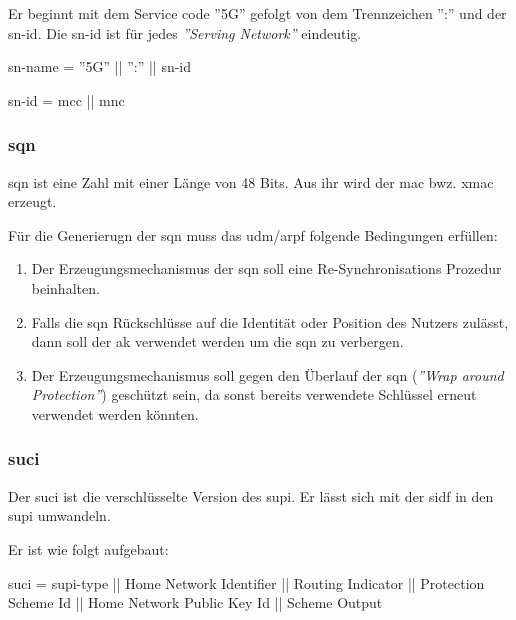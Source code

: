 Er beginnt mit dem Service code ''5G'' gefolgt von dem Trennzeichen '':'' und der \gls{sn-id}.
Die \gls{sn-id} ist f\"ur jedes \textit{''Serving Network''} eindeutig.

\gls{sn-name} = ''5G'' || '':'' || \gls{sn-id}

\gls{sn-id} = \gls{mcc} || \gls{mnc}

\subsubsection{\gls{sqn}}
\gls{sqn} ist eine Zahl mit einer L\"ange von 48 Bits. %
Aus ihr wird der \gls{mac} bwz. \gls{xmac} erzeugt. %

F\"ur die Generierugn der \gls{sqn} muss das \gls{udm}/\gls{arpf} folgende Bedingungen erf\"ullen:\\%
\begin{enumerate}
\item Der Erzeugungsmechanismus der \gls{sqn} soll eine Re-Synchronisations Prozedur beinhalten.\\
\item Falls die \gls{sqn} R\"uckschl\"usse auf die Identit\"at oder Position des Nutzers zul\"asst, dann soll der \gls{ak} verwendet werden um die \gls{sqn} zu verbergen.\\
\item Der Erzeugungsmechanismus soll gegen den \"Uberlauf der \gls{sqn} (\textit{''Wrap around Protection''}) gesch\"utzt sein, da sonst bereits verwendete Schl\"ussel erneut verwendet werden k\"onnten. 
\end{enumerate}

\subsubsection{\gls{suci}}
Der \gls{suci} ist die verschl\"usselte Version des \gls{supi}.
Er l\"asst sich mit der \gls{sidf} in den \gls{supi} umwandeln.

Er ist wie folgt aufgebaut: %

\gls{suci} = \gls{supi-type} || Home Network Identifier || Routing Indicator || Protection Scheme Id || Home Network Public Key Id || Scheme Output

